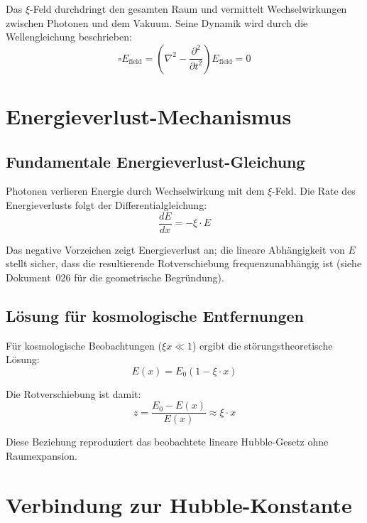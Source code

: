 	Das $\xi$-Feld durchdringt den gesamten Raum und vermittelt Wechselwirkungen zwischen Photonen und dem Vakuum. Seine Dynamik wird durch die Wellengleichung beschrieben:
	\begin{equation}
		\square E_{\text{field}} = \left(\nabla^2 - \frac{\partial^2}{\partial t^2}\right) E_{\text{field}} = 0
	\end{equation}

\section{Energieverlust-Mechanismus}

	\subsection{Fundamentale Energieverlust-Gleichung}

	Photonen verlieren Energie durch Wechselwirkung mit dem $\xi$-Feld. Die Rate des Energieverlusts folgt der Differentialgleichung:
	\begin{equation}
		\frac{dE}{dx} = -\xi \cdot E
	\end{equation}

	Das negative Vorzeichen zeigt Energieverlust an; die lineare Abhängigkeit von $E$ stellt sicher, dass die resultierende Rotverschiebung frequenzunabhängig ist (siehe Dokument~026 für die geometrische Begründung).

	\subsection{Lösung für kosmologische Entfernungen}

	Für kosmologische Beobachtungen ($\xi x \ll 1$) ergibt die störungstheoretische Lösung:
	\begin{equation}
		E(x) = E_0 \left(1 - \xi \cdot x\right)
	\end{equation}

	Die Rotverschiebung ist damit:
	\begin{equation}
		z = \frac{E_0 - E(x)}{E(x)} \approx \xi \cdot x
	\end{equation}

	Diese Beziehung reproduziert das beobachtete lineare Hubble-Gesetz ohne Raumexpansion.

\section{Verbindung zur Hubble-Konstante}

